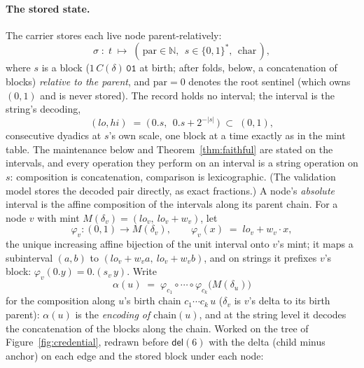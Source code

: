 \documentclass[11pt]{article}
\newcommand{\code}[1]{\texttt{#1}}
\newcommand{\del}{\mathsf{del}}
\newcommand{\chain}{\mathrm{chain}}
\begin{document}
\paragraph{The stored state.} The carrier stores each live node
parent-relatively:
\[
  \sigma \;:\; t \;\mapsto\; (\,\mathrm{par} \in \mathbb{N},\ \
  s \in \{0,1\}^{*},\ \ \mathrm{char}\,),
\]
where $s$ is a block ($1\,C(\delta)\,\code{01}$ at birth; after
folds, below, a concatenation of blocks) \emph{relative to the
parent}, and $\mathrm{par} = 0$ denotes the root sentinel (which
owns $(0,1)$ and is never stored). The record holds no interval; the
interval is the string's decoding,
\[
  (lo, hi) \;=\; \bigl(\,0.s,\ \ 0.s + 2^{-|s|}\,\bigr)
  \;\subset\; (0,1),
\]
consecutive dyadics at $s$'s own scale, one block at a time exactly
as in the mint table. The maintenance below and
Theorem~\ref{thm:faithful} are stated on the intervals, and every
operation they perform on an interval is a string operation on $s$:
composition is concatenation, comparison is lexicographic. (The
validation model stores the decoded pair directly, as exact
fractions.) A node's \emph{absolute} interval is the affine
composition of the intervals along its parent chain. For a node $v$
with mint $M(\delta_v) = (lo_v,\ lo_v + w_v)$, let
\[
  \varphi_v : (0,1) \to M(\delta_v), \qquad
  \varphi_v(x) \;=\; lo_v + w_v \cdot x,
\]
the unique increasing affine bijection of the unit interval onto
$v$'s mint; it maps a subinterval $(a,b)$ to
$(lo_v + w_v a,\ lo_v + w_v b)$, and on strings it prefixes $v$'s
block: $\varphi_v(0.y) = 0.(s_v\, y)$. Write
\[
  \alpha(u) \;=\; \varphi_{c_1} \circ \cdots \circ
  \varphi_{c_k}\bigl(M(\delta_u)\bigr)
\]
for the composition along $u$'s birth chain $c_1 \cdots c_k\,u$
($\delta_v$ is $v$'s delta to its birth parent): $\alpha(u)$ is the
\emph{encoding of $\chain(u)$}, and at the string level it decodes
the concatenation of the blocks along the chain. Worked on the tree
of Figure~\ref{fig:credential}, redrawn before $\del(6)$ with the
delta (child minus anchor) on each edge and the stored block under
each node:
\end{document}
